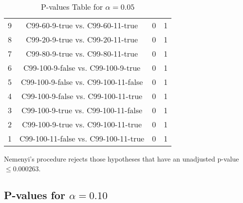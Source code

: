 \documentclass[a4paper,10pt]{article}
\begin{document}
\begin{landscape}
\begin{table}[!htp]
\begin{tabular}{cccc}
9&C99-60-9-true vs. C99-60-11-true&0&1\\
8&C99-20-9-true vs. C99-20-11-true&0&1\\
7&C99-80-9-true vs. C99-80-11-true&0&1\\
6&C99-100-9-false vs. C99-100-9-true&0&1\\
5&C99-100-9-false vs. C99-100-11-false&0&1\\
4&C99-100-9-false vs. C99-100-11-true&0&1\\
3&C99-100-9-true vs. C99-100-11-false&0&1\\
2&C99-100-9-true vs. C99-100-11-true&0&1\\
1&C99-100-11-false vs. C99-100-11-true&0&1\\
\hline
\end{tabular}
\caption{P-values Table for $\alpha=0.05$}
\end{table}Nemenyi's procedure rejects those hypotheses that have an unadjusted p-value $\le0.000263$.

\pagebreak

\subsection{P-values for $\alpha=0.10$}


\end{landscape}
\end{document}

